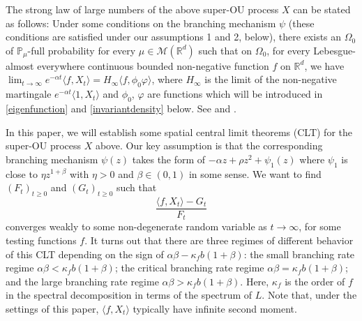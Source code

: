 \documentclass[12pt,a4paper]{amsart}
\theoremstyle{plain}
\theoremstyle{definition}
\numberwithin{equation}{section}
\begin{document}
    The strong law of large numbers of the above super-OU process $X$ can be stated as follows: 
    Under some conditions on the branching mechanism $\psi$ (these conditions are satisfied under our assumptions 1 and 2, below), there exists an $\Omega_0$ of $\mathbb{P}_\mu$-full probability for every $\mu\in\mathcal M(\mathbb R^d)$ such that on $\Omega_0$, 
    for every Lebesgue-almost everywhere continuous bounded non-negative function $f$ on $\mathbb R^d$, 
    we have
    $\lim_{t\to\infty}e^{-\alpha t}\langle f, X_t\rangle=H_\infty\langle f,\phi_0\varphi\rangle $, 
    where $H_\infty$ is the limit of the non-negative martingale $e^{-\alpha t}\langle 1,X_t\rangle$ and $\phi_0$, $\varphi$ are functions which will be introduced in  \eqref{eigenfunction} and \eqref{invariantdensity} below.
    See \cite[Theorem 2.13 \& Example 8.1]{ChenRenYang2019Skeleton} and \cite[Theorem 1.2 \& Example 4.1]{EckhoffKyprianouWinkel2015Spines}.

    In this paper, we will establish some spatial central limit theorems (CLT) for the super-OU process $X$ above. 
    Our key assumption is that the corresponding branching mechanism $\psi(z)$ takes the form of $-\alpha z +\rho z^2+ \psi_1(z)$ where $\psi_1$ is close to $\eta z^{1+\beta}$ with $\eta>0$ and $\beta\in (0, 1)$ in some sense.
    We want to find
    $(F_t)_{t\geq 0}$ and $(G_t)_{t\geq 0}$ such that
\[
    \frac{\langle f, X_t \rangle -G_t}{F_t}
\]
    converges weakly to some non-degenerate random variable as $t\rightarrow\infty$, 
    for some testing functions $f$.
    It turns out that there are three regimes of different behavior of this CLT depending on the sign of $\alpha\beta-\kappa_f b (1+\beta)$: the small branching rate regime $\alpha\beta< \kappa_f b(1+\beta)$; the critical branching rate regime $\alpha\beta = \kappa_f b(1+\beta)$; and the large branching rate regime $\alpha\beta > \kappa_f b(1+\beta)$. Here, $\kappa_f$ is the order of $f$ in the spectral decomposition in terms of the spectrum of $L$. 
    Note that, under the settings of this paper, $\langle f,X_t\rangle$ typically have infinite second moment.
\end{document}
